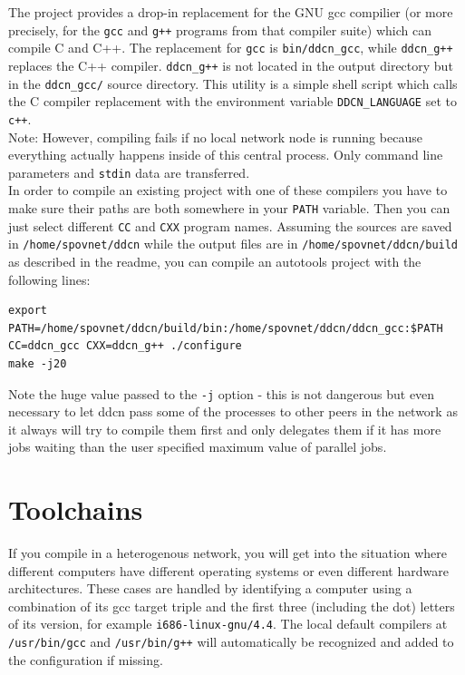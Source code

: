 \documentclass[a4paper,9pt]{scrartcl}
\begin{document}
The project provides a drop-in replacement for the GNU gcc compilier (or more precisely, for the \texttt{gcc} and \texttt{g++} programs from that compiler suite) which can compile C and C++. The replacement for \texttt{gcc} is \texttt{bin/ddcn\_gcc}, while \texttt{ddcn\_g++} replaces the C++ compiler. \texttt{ddcn\_g++} is not located in the output directory but in the \texttt{ddcn\_gcc/} source directory. This utility is a simple shell script which calls the C compiler replacement with the environment variable \texttt{DDCN\_LANGUAGE} set to \texttt{c++}.\\
Note: However, compiling fails if no local network node is running because everything actually happens inside of this central process. Only command line parameters and \texttt{stdin} data are transferred.\\
\smallskip
In order to compile an existing project with one of these compilers you have to make sure their paths are both somewhere in your \texttt{PATH} variable. Then you can just select different \texttt{CC} and \texttt{CXX} program names. Assuming the sources are saved in \texttt{/home/spovnet/ddcn} while the output files are in \texttt{/home/spovnet/ddcn/build} as described in the readme, you can compile an autotools project with the following lines:

\begin{verbatim}
export PATH=/home/spovnet/ddcn/build/bin:/home/spovnet/ddcn/ddcn_gcc:$PATH
CC=ddcn_gcc CXX=ddcn_g++ ./configure
make -j20
\end{verbatim} 

Note the huge value passed to the \texttt{-j} option - this is not dangerous but even necessary to let ddcn pass some of the processes to other peers in the network as it always will try to compile them first and only delegates them if it has more jobs waiting than the user specified maximum value of parallel jobs.

\section{Toolchains}

If you compile in a heterogenous network, you will get into the situation where different computers have different operating systems or even different hardware architectures. These cases are handled by identifying a computer using a combination of its gcc target triple and the first three (including the dot) letters of its version, for example \texttt{i686-linux-gnu/4.4}. The local default compilers at \texttt{/usr/bin/gcc} and \texttt{/usr/bin/g++} will automatically be recognized and added to the configuration if missing.
\end{document}
